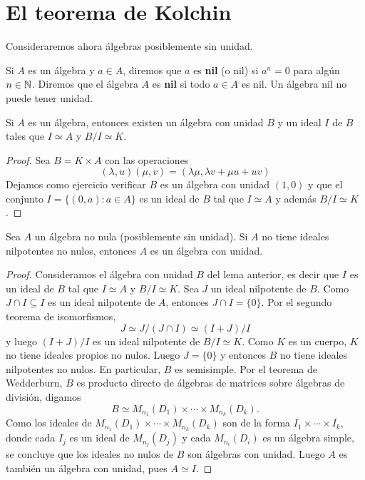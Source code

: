 \chapter{El teorema de Kolchin}


Consideraremos ahora álgebras posiblemente sin unidad. 

Si $A$ es un álgebra y $a\in A$, diremos que $a$ es \textbf{nil} (o nil) si 
$a^n=0$ para algún $n\in\mathbb{N}$. Diremos que el álgebra $A$ es \textbf{nil} si
todo $a\in A$ es nil.  Un álgebra nil no puede tener unidad. 

\begin{lemma}
Si $A$ es un álgebra, entonces existen un álgebra con unidad $B$ y un ideal $I$ 
de $B$ tales que $I\simeq A$ y $B/I\simeq K$.  
\end{lemma}

\begin{proof}
Sea $B=K\times A$ con las operaciones
\[
(\lambda,u)(\mu,v)=(\lambda\mu,\lambda v+\mu u+uv)
\]
Dejamos como ejercicio verificar $B$ es un álgebra
con unidad $(1,0)$ y que el conjunto 
$I=\{(0,a):a\in A\}$ es un ideal de $B$ 
tal que $I\simeq A$ y además $B/I\simeq K$. 
\end{proof}

\begin{proposition}
Sea $A$ un álgebra no nula (posiblemente sin unidad). Si $A$ no tiene ideales
nilpotentes no nulos, entonces $A$ es un álgebra con unidad. 
\end{proposition}

\begin{proof}
Consideramos el álgebra con unidad $B$ del lema anterior, es decir que $I$ es un 
ideal de $B$ tal que $I\simeq A$ y $B/I\simeq K$. 
Sea $J$ un ideal nilpotente de $B$. Como $J\cap I\subseteq I$ es un ideal
nilpotente de $A$, entonces $J\cap I=\{0\}$. Por el segundo teorema de isomorfismos,
\[
J\simeq J/(J\cap I)\simeq (I+J)/I
\]
y luego $(I+J)/I$ es un ideal nilpotente de $B/I\simeq K$. Como $K$ es un cuerpo,
$K$ no tiene ideales propios no nulos. Luego $J=\{0\}$ y entonces
$B$ no tiene ideales nilpotentes no nulos. En particular, $B$ es semisimple. Por el 
teorema de Wedderburn, $B$ es producto directo de álgebras de matrices
sobre álgebras de división,
digamos
\[
B\simeq M_{n_1}(D_1)\times\cdots\times M_{n_k}(D_k).
\]
Como los ideales de $M_{n_1}(D_1)\times\cdots\times M_{n_k}(D_k)$ 
son de la forma $I_1\times\cdots\times I_k$, donde cada $I_j$ es un ideal de $M_{n_j}(D_j)$ y  
cada $M_{n_i}(D_i)$ es un álgebra simple, se concluye que los ideales no nulos de $B$
son álgebras con unidad. Luego $A$ es también un álgebra con unidad,
pues $A\simeq I$.    
\end{proof}

